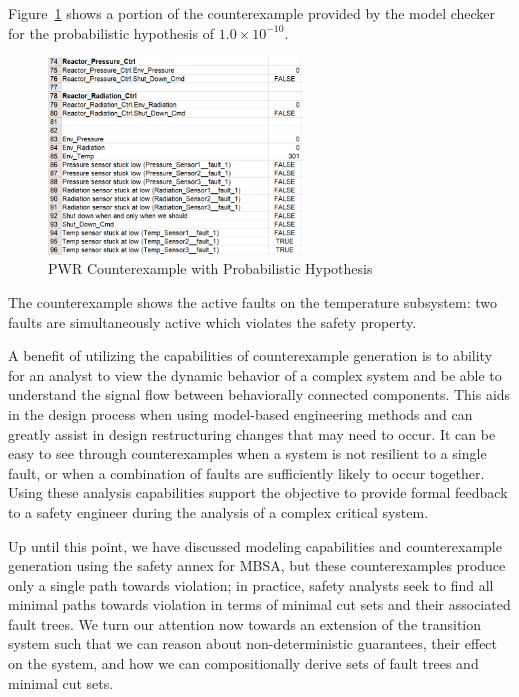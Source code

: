 Figure~\ref{fig:probPWRVerifCoex} shows a portion of the counterexample provided by the model checker for the probabilistic hypothesis of $1.0 \times 10^{-10}$. 

\begin{figure}[h!]
		\includegraphics[width=0.6\textwidth]{images/probPWRVerifCoex.png}
	\caption{PWR Counterexample with Probabilistic Hypothesis}
	\label{fig:probPWRVerifCoex}
\end{figure}

The counterexample shows the active faults on the temperature subsystem: two faults are simultaneously active which violates the safety property. 

A benefit of utilizing the capabilities of counterexample generation is to ability for an analyst to view the dynamic behavior of a complex system and be able to understand the signal flow between behaviorally connected components. This aids in the design process when using model-based engineering methods and can greatly assist in design restructuring changes that may need to occur. It can be easy to see through counterexamples when a system is not resilient to a single fault, or when a combination of faults are sufficiently likely to occur together. Using these analysis capabilities support the objective to provide formal feedback to a safety engineer during the analysis of a complex critical system.

Up until this point, we have discussed modeling capabilities and counterexample generation using the safety annex for MBSA, but these counterexamples produce only a single path towards violation; in practice, safety analysts seek to find all minimal paths towards violation in terms of minimal cut sets and their associated fault trees. We turn our attention now towards an extension of the transition system such that we can reason about non-deterministic guarantees, their effect on the system, and how we can compositionally derive sets of fault trees and minimal cut sets. 